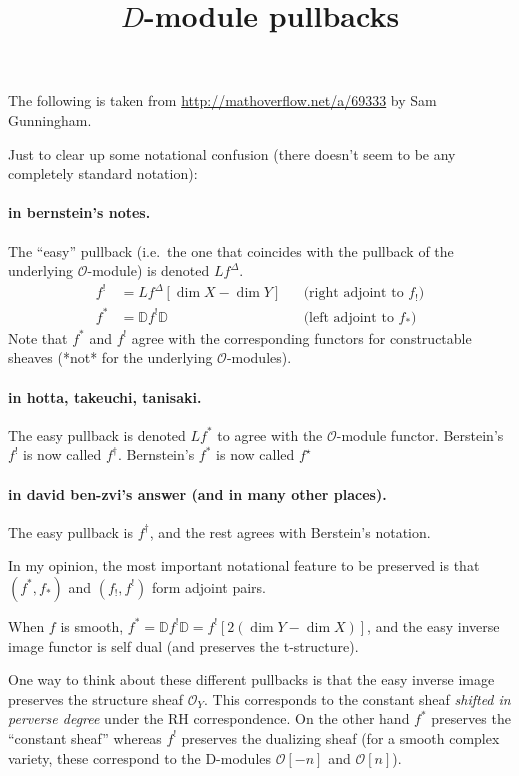 \documentclass[english, no-theorem-numbers]{short-notes}
\title{\texorpdfstring{$D$}{D}-module pullbacks}
\author{}
\begin{document}
\maketitle

The following is taken from \url{http://mathoverflow.net/a/69333} by Sam Gunningham.

\bigskip
\noindent Just to clear up some notational confusion (there doesn't seem to be any completely standard notation):

\paragraph{in bernstein's notes.}
The \enquote{easy} pullback (i.e.~the one that coincides with the pullback of the underlying $\mathcal O$-module) is denoted $Lf^\Delta$.
\begin{align*}
    f^! & = Lf^\Delta [\dim X - \dim Y] & & \text{(right adjoint to $f_!$)} \\
    f^\ast & = \mathbb D f^! \mathbb D & & \text{(left adjoint to $f_\ast$)}
\end{align*}
Note that $f^\ast$ and $f^!$ agree with the corresponding functors for constructable sheaves (*not* for the underlying $\mathcal O$-modules).

\paragraph{in hotta, takeuchi, tanisaki.}
The easy pullback is denoted $Lf^\ast$ to agree with the $\mathcal O$-module functor.
Berstein's $f^!$ is now called $f^\dagger$.
Bernstein's $f^\ast$ is now called $f^\star$

\paragraph{in david ben-zvi's answer (and in many other places).}
The easy pullback is $f^\dagger$, and the rest agrees with Berstein's notation.

\bigskip
\noindent 
In my opinion, the most important notational feature to be preserved is that $(f^\ast , f_\ast)$ and $(f_! , f^!)$ form adjoint pairs.

When $f$ is smooth, $f^\ast = \mathbb D f^! \mathbb D = f^! [2(\dim Y - \dim X)]$, and the easy inverse image functor is self dual (and preserves the t-structure).

One way to think about these different pullbacks is that the easy inverse image preserves the structure sheaf $\mathcal O_Y$.
This corresponds to the constant sheaf \emph{shifted in perverse degree} under the RH correspondence.
On the other hand $f^\ast$ preserves the \enquote{constant sheaf} whereas $f^!$ preserves the dualizing sheaf (for a smooth complex variety, these correspond to the D-modules $\mathcal O[-n]$ and $\mathcal O[n]$).

\end{document}
